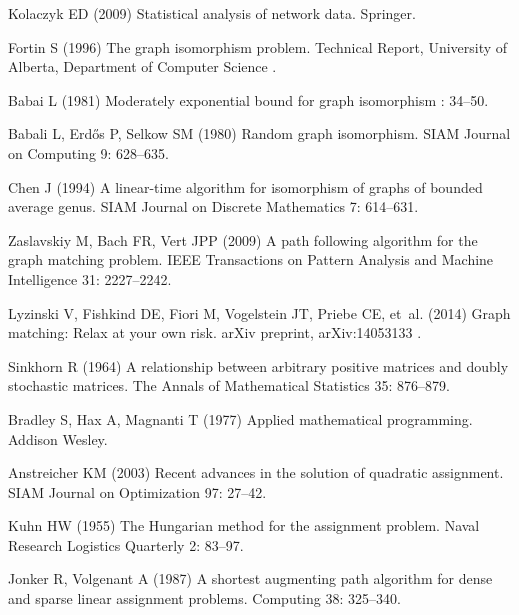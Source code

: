 \documentclass[10pt]{article}
\begin{document}
\begin{thebibliography}{10}
Kolaczyk ED (2009) Statistical analysis of network data.
\newblock Springer.

Fortin S (1996) {The graph isomorphism problem}.
\newblock Technical Report, University of Alberta, Department of Computer
  Science .

Babai L (1981) Moderately exponential bound for graph isomorphism : 34--50.

Babali L, Erdős P, Selkow SM (1980) {Random graph isomorphism}.
\newblock SIAM Journal on Computing 9: 628--635.

Chen J (1994) {A linear-time algorithm for isomorphism of graphs of bounded
  average genus}.
\newblock SIAM Journal on Discrete Mathematics 7: 614--631.

Zaslavskiy M, Bach FR, Vert JPP (2009) {A path following algorithm for the
  graph matching problem}.
\newblock IEEE Transactions on Pattern Analysis and Machine Intelligence 31:
  2227--2242.

Lyzinski V, Fishkind DE, Fiori M, Vogelstein JT, Priebe CE, et~al. (2014) Graph
  matching: Relax at your own risk.
\newblock arXiv preprint, arXiv:14053133 .

Sinkhorn R (1964) {A relationship between arbitrary positive matrices and
  doubly stochastic matrices}.
\newblock The Annals of Mathematical Statistics 35: 876--879.

Bradley S, Hax A, Magnanti T (1977) Applied mathematical programming.
\newblock Addison Wesley.

Anstreicher KM (2003) {Recent advances in the solution of quadratic
  assignment}.
\newblock SIAM Journal on Optimization 97: 27--42.

Kuhn HW (1955) {The Hungarian method for the assignment problem}.
\newblock Naval Research Logistics Quarterly 2: 83--97.

Jonker R, Volgenant A (1987) {A shortest augmenting path algorithm for dense
  and sparse linear assignment problems}.
\newblock Computing 38: 325--340.


\end{thebibliography}
\end{document}
